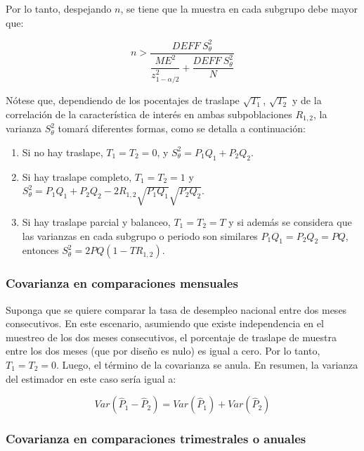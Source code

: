 \documentclass[
  12pt,
  spanish,
]{book}
\providecommand{\tightlist}{%
  \setlength{\itemsep}{0pt}\setlength{\parskip}{0pt}}
\begin{document}
Por lo tanto, despejando \(n\), se tiene que la muestra en cada subgrupo debe mayor que:

\[
 n> \dfrac{DEFF \ S^2_{\theta}}{\dfrac{ME^2}{z_{1-\alpha/2}^2}+\dfrac{DEFF \ S^2_{\theta}}{N}}
\]

Nótese que, dependiendo de los pocentajes de traslape \(\sqrt{T_1}\), \(\sqrt{T_2}\) y de la correlación de la característica de interés en ambas subpoblaciones \(R_{1,2}\), la varianza \(S^2_{\theta}\) tomará diferentes formas, como se detalla a continuación:

\begin{enumerate}
\def\labelenumi{\arabic{enumi}.}
\tightlist
\item
  Si no hay traslape, \(T_1 = T_2 = 0\), y \(S^2_{\theta} = P_1Q_1+P_2Q_2\).
\item
  Si hay traslape completo, \(T_1 = T_2 = 1\) y \(S^2_{\theta} = P_1Q_1+P_2Q_2 - 2 R_{1,2} \sqrt{P_1Q_1}\sqrt{P_2Q_2}\).
\item
  Si hay traslape parcial y balanceo, \(T_1 = T_2 = T\) y si además se considera que las varianzas en cada subgrupo o periodo son similares \(P_1Q_1 = P_2Q_2 = PQ\), entonces \(S^2_{\theta} = 2PQ (1- TR_{1,2})\).
\end{enumerate}

\hypertarget{covarianza-en-comparaciones-mensuales}{%
\subsubsection{Covarianza en comparaciones mensuales}\label{covarianza-en-comparaciones-mensuales}}

Suponga que se quiere comparar la tasa de desempleo nacional entre dos meses consecutivos. En este escenario, asumiendo que existe independencia en el muestreo de los dos meses consecutivos, el porcentaje de traslape de muestra entre los dos meses (que por diseño es nulo) es igual a cero. Por lo tanto, \(T_1 = T_2 = 0\). Luego, el término de la covarianza se anula. En resumen, la varianza del estimador en este caso sería igual a:

\[
Var(\hat{P}_1-\hat{P}_2) 
= Var(\hat{P}_1) + Var(\hat{P}_2)
\]

\hypertarget{covarianza-en-comparaciones-trimestrales-o-anuales}{%
\subsubsection{Covarianza en comparaciones trimestrales o anuales}\label{covarianza-en-comparaciones-trimestrales-o-anuales}}
\end{document}
